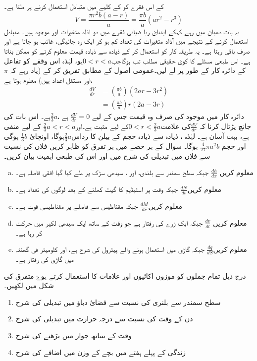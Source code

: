  کے اس فقرے کو  کے کلیے میں متبادل استعمال کرنے پر ملتا ہے۔
 \[ V=\frac{\pi r^2b(a-r)}{a}=\frac{\pi b}{a}(ar^2-r^3) \]   
یہ بات دھیان میں رہے کہکے ابتدائ ریا ضیاتی فقرے میں دو آذاد متغیرات  اور موجود ہیں۔
متبادل استعمال کرنے کے نتیجے میں آذاد متغیرات کی تعداد کم ہو کر ایک رہ جائیگی،  غائب ہو جاتا ہے اور صرف   باقی رہتا ہے۔ یہ طریقہ کار کو استعمال کر کے ذیادہ سے ذیادہ قیمت معلوم کرنے کو ممکن بناتا ہے۔ اس طبعی مسئلے کا کوئ حقیقی مطلب تب ہوگاجب\( 0<r<a \)ہو، لہٰذہ اس وقفے کو تفاعل کے دائرہ کار کے طور پر لے لیں۔عمومی اصول کے مطابق تفریق کر کے (یاد رہے کہ   $\pi $    اور   مستقل اعداد ہیں) معلوم ہوتا ہے،
\begin{align*}
\frac{dV}{dr}&=\left(\frac{\pi b}{a}\right)(2ar-3r^2)\\
&=\left(\frac{\pi b}{a}\right)r(2a-3r)
\end{align*}
دائرہ کار  میں موجود  کی صرف وہ قیمت جس کے لیے \(\frac{dV}{dr}=0 \) ہے ،$\frac{2}{3}a$ہے۔ اس بات کی جانچ پڑتال کرنا کہ \(\frac{dV}{dr}\)کی علامت\(0<r<\frac{2}{3}a\)کے لیے مثبت ہے۔اور$\frac{2}{3}a<r<a $ کے لیے منفی ہے، بہت آسان ہے۔
لہٰذہ ، ذیادہ سے ذیادہ حجم کے بیلن کا رداس\( \frac{2}{3}a \)ہوگا، اونچائ $\frac{1}{3}b $ ہوگی اور حجم  $\frac{4}{27}\pi a^2b $ ہوگا۔  
سوال کے ہر حصے میں ہر تفرق کو ظاہر کریں فلاں کی نسبت سے فلاں میں تبدیلی کی شرح میں اور اس کی طبعی اہمیت بیان کریں۔
\begin{enumerate}[a.]
\item
معلوم کریں \(    \frac{dh}{dx}    \) جبکہ  سطح سمندر سے بلندی، اور   ، سیدھی سڑک پر طے کیا گیا  افقی فاصلہ ہے۔
\item
معلوم کریں\(      \frac{dN}{dt}   \) جبکہ  وقت پر اسٹیڈیم کا گیٹ کھلنے کے بعد لوگوں کی تعداد ہے۔  
\item
معلوم کریں\(     \frac{dM}{dr}   \) جبکہ  مقناطیس سے فاصلے  پر مقناطیسی قوت ہے۔
\item
معلوم کریں \(    \frac{dv}{dt}   \) جبکہ  ایک زرے کی رفتار ہے جو  وقت  کے ساتھ ایک سیدھی لکیر میں حرکت کر رہا ہے۔
\item
معلوم کریں\(    \frac{dq}{dS}   \) جبکہ  گاڑی میں استعمال ہونے والے پیٹرول کی شرح ہے، اور  کلومیٹر فی گھنٹہ میں گاڑی کی رفتار ہے۔
\end{enumerate}
درج ذیل تمام جملوں کو موزوں اکائیوں اور علامات کا استعمال کرتے ہوۓ متفرق کی شکل میں لکھیں۔
\begin{enumerate}
\item
سطح سمندر سے بلنری کی نسبت سے فضائ دباؤ میں تبدیلی کی شرح
\item
دن کے وقت کی نسبت سے درجہ حرارت میں تبدیلی کی شرح
\item
وقت کے ساتھ جوار میں بڑھنے کی شرح
\item
زندگی کے پہلے ہفتے میں بچے کے وزن میں اضافے کی شرح
\end{enumerate}

